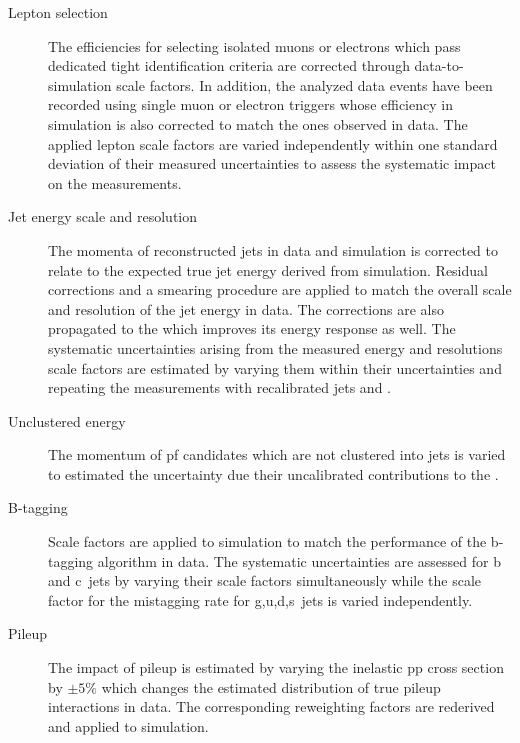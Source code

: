 \begin{description}
\item[Lepton selection] The efficiencies for selecting isolated muons or electrons which pass dedicated tight identification criteria are corrected through data-to-simulation scale factors. In addition, the analyzed data events have been recorded using single muon or electron triggers whose efficiency in simulation is also corrected to match the ones observed in data. The applied lepton scale factors are varied independently within one standard deviation of their measured uncertainties to assess the systematic impact on the measurements.
\item[Jet energy scale and resolution] The momenta of reconstructed jets in data and simulation is corrected to relate to the expected true jet energy derived from simulation. Residual corrections and a smearing procedure are applied to match the overall scale and resolution of the jet energy in data. The corrections are also propagated to the \met which improves its energy response as well. The systematic uncertainties arising from the measured energy and resolutions scale factors are estimated by varying them within their uncertainties and repeating the measurements with recalibrated jets and \met.
\item[Unclustered energy] The momentum of \gls{pf} candidates which are not clustered into jets is varied to estimated the uncertainty due their uncalibrated contributions to the \met.
\item[B-tagging] Scale factors are applied to simulation to match the performance of the b-tagging algorithm in data. The systematic uncertainties are assessed for b and c~jets by varying their scale factors simultaneously while the scale factor for the mistagging rate for g,u,d,s~jets is varied independently.
\item[Pileup] The impact of pileup is estimated by varying the inelastic \gls{pp} cross section by $\pm5\%$ which changes the estimated distribution of true pileup interactions in data. The corresponding reweighting factors are rederived and applied to simulation.
\end{description}

